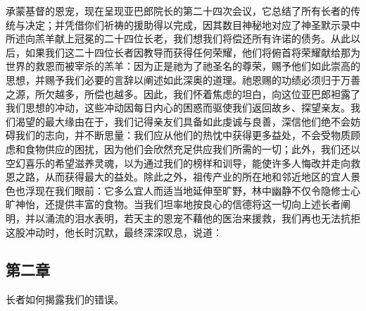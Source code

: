 承蒙基督的恩宠，现在呈现亚巴郎院长的第二十四次会议，它总结了所有长者的传统与决定；并凭借你们祈祷的援助得以完成，因其数目神秘地对应了神圣默示录中所述向羔羊献上冠冕的二十四位长老，我们想我们将偿还所有许诺的债务。从此以后，如果我们这二十四位长者因教导而获得任何荣耀，他们将俯首将荣耀献给那为世界的救恩而被宰杀的羔羊：因为正是祂为了祂圣名的尊荣，赐予他们如此崇高的思想，并赐予我们必要的言辞以阐述如此深奥的道理。祂恩赐的功绩必须归于万善之源，所欠越多，所偿也越多。因此，我们怀着焦虑的坦白，向这位亚巴郎袒露了我们思想的冲动，这些冲动因每日内心的困惑而驱使我们返回故乡、探望亲友。我们渴望的最大缘由在于，我们记得亲友们具备如此虔诚与良善，深信他们绝不会妨碍我们的志向，并不断思量：我们应从他们的热忱中获得更多益处，不会受物质顾虑和食物供应的困扰，因为他们会欣然充足供应我们所需的一切；此外，我们还以空幻喜乐的希望滋养灵魂，以为通过我们的榜样和训导，能使许多人悔改并走向救恩之路，从而获得最大的益处。除此之外，祖传产业的所在地和邻近地区的宜人景色也浮现在我们眼前：它多么宜人而适当地延伸至旷野，林中幽静不仅令隐修士心旷神怡，还提供丰富的食物。当我们坦率地按良心的信德将这一切向上述长者阐明，并以涌流的泪水表明，若天主的恩宠不藉他的医治来援救，我们再也无法抗拒这股冲动时，他长时沉默，最终深深叹息，说道：\par


\subsection{第二章}

长者如何揭露我们的错误。\par

